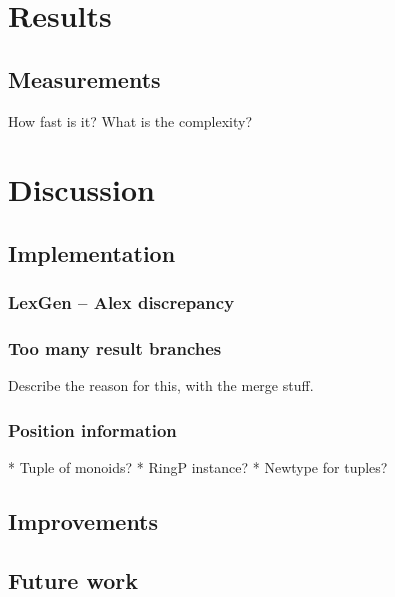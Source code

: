 \documentclass[a4paper,12pt,twosided]{report}
\begin{document}
%
%

\chapter{Results}

\section{Measurements}
How fast is it? What is the complexity?

%
%
\chapter{Discussion}

\section{Implementation}
\subsection{LexGen -- Alex discrepancy}
\subsection{Too many result branches}
Describe the reason for this, with the merge stuff.

\subsection{Position information}
* Tuple of monoids?
* RingP instance?
* Newtype for tuples?

\section{Improvements}
\section{Future work}

%
%



%
%
\end{document}
